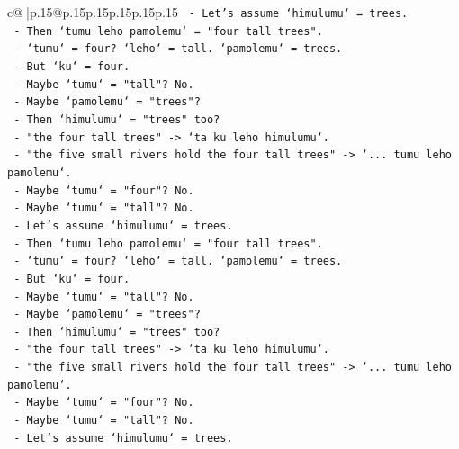 \documentclass{article}
\begin{document}
{\begin{supertabular}{c@{$\;$}|p{.15\linewidth}@{}p{.15\linewidth}p{.15\linewidth}p{.15\linewidth}p{.15\linewidth}p{.15\linewidth}}
{{{\texttt{                    {-} Let's assume `himulumu` = trees.} \\
\texttt{                    {-} Then `tumu leho pamolemu` = "four tall trees".} \\
\texttt{                    {-} `tumu` = four? `leho` = tall. `pamolemu` = trees.} \\
\texttt{                    {-} But `ku` = four.} \\
\texttt{                    {-} Maybe `tumu` = "tall"? No.} \\
\texttt{                    {-} Maybe `pamolemu` = "trees"?} \\
\texttt{                    {-} Then `himulumu` = "trees" too?} \\
\texttt{                    {-} "the four tall trees" {-}> `ta ku leho himulumu`.} \\
\texttt{                    {-} "the five small rivers hold the four tall trees" {-}> `... tumu leho pamolemu`.} \\
\texttt{                    {-} Maybe `tumu` = "four"? No.} \\
\texttt{                    {-} Maybe `tumu` = "tall"? No.} \\
\texttt{                    {-} Let's assume `himulumu` = trees.} \\
\texttt{                    {-} Then `tumu leho pamolemu` = "four tall trees".} \\
\texttt{                    {-} `tumu` = four? `leho` = tall. `pamolemu` = trees.} \\
\texttt{                    {-} But `ku` = four.} \\
\texttt{                    {-} Maybe `tumu` = "tall"? No.} \\
\texttt{                    {-} Maybe `pamolemu` = "trees"?} \\
\texttt{                    {-} Then `himulumu` = "trees" too?} \\
\texttt{                    {-} "the four tall trees" {-}> `ta ku leho himulumu`.} \\
\texttt{                    {-} "the five small rivers hold the four tall trees" {-}> `... tumu leho pamolemu`.} \\
\texttt{                    {-} Maybe `tumu` = "four"? No.} \\
\texttt{                    {-} Maybe `tumu` = "tall"? No.} \\
\texttt{                    {-} Let's assume `himulumu` = trees.} \\
}}}
\end{supertabular}}
\end{document}
